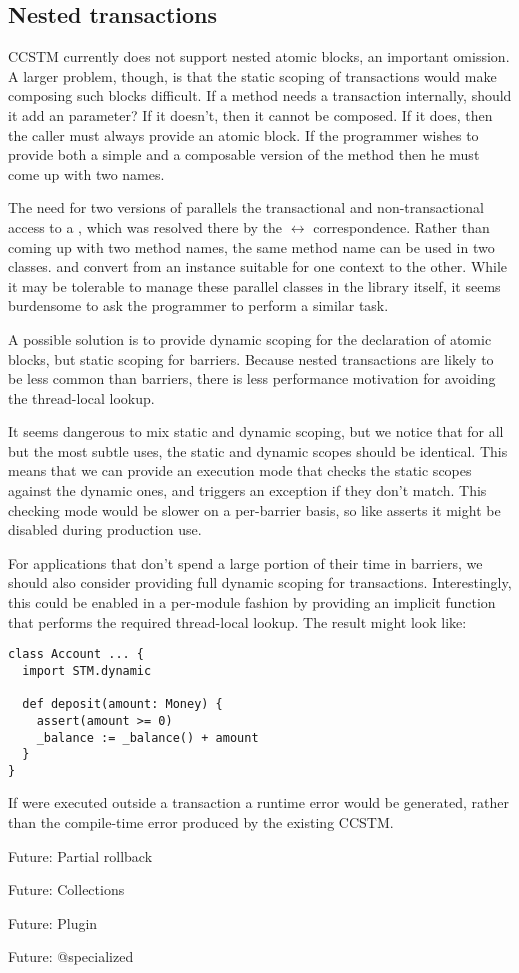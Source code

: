 \subsection{Nested transactions}

CCSTM currently does not support nested atomic blocks, an important
omission.  A larger problem, though, is that the static scoping
of transactions would make composing such blocks difficult.  If a
method  needs a transaction internally, should it add an
  parameter?  If it doesn't, then it
cannot be composed.  If it does, then the caller must always provide
an atomic block.  If the programmer wishes to provide both a simple
and a composable version of the method then he must come up with
two names.

The need for two versions of  parallels the transactional and
non-transactional access to a , which was resolved there by the
 $\leftrightarrow$  correspondence.  Rather than
coming up with two method names, the same method name can be used in
two classes.   and 
convert from an instance suitable for one context to the other.  While it
may be tolerable to manage these parallel classes in the library itself,
it seems burdensome to ask the programmer to perform a similar task.

A possible solution is to provide dynamic scoping for the declaration
of atomic blocks, but static scoping for barriers.  Because nested
transactions are likely to be less common than barriers, there is less
performance motivation for avoiding the thread-local lookup.

It seems dangerous to mix static and dynamic scoping, but we notice that
for all but the most subtle uses, the static and dynamic scopes should be
identical.  This means that we can provide an execution mode that checks
the
static scopes against the dynamic ones, and triggers an exception 
if they don't match.  This checking mode would be slower on a per-barrier
basis, so like asserts it might be disabled during production use.

For applications that don't spend a large portion of their time in barriers, we
should also consider providing full dynamic scoping for transactions.
Interestingly, this could be enabled in a per-module fashion by providing an
implicit function that performs the required thread-local lookup.  The result
might look like:
\lstset{numbers=none}
\begin{lstlisting}
class Account ... {
  import STM.dynamic

  def deposit(amount: Money) {
    assert(amount >= 0)
    _balance := _balance() + amount
  }
}
\end{lstlisting}
\lstset{numbers=left}
If  were executed outside a transaction a runtime error would be
generated, rather than the compile-time error produced by the existing CCSTM.

Future: Partial rollback

Future: Collections

Future: Plugin

Future: @specialized

\color{black}
